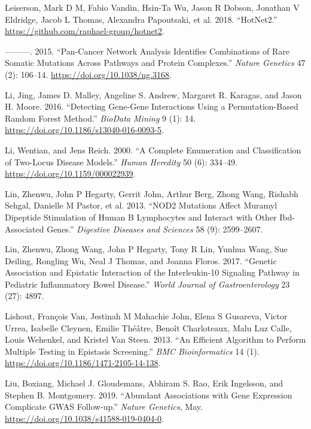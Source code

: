 \documentclass[
  11pt,
]{env/yjiao}
\newlength{\cslhangindent}
\newenvironment{cslreferences}%
  {\setlength{\parindent}{0pt}%
  \everypar{\setlength{\hangindent}{\cslhangindent}}\ignorespaces}%
  {\par}
\begin{document}
\begin{cslreferences}
\leavevmode\hypertarget{ref-hotnet2}{}%
Leiserson, Mark D M, Fabio Vandin, Hsin-Ta Wu, Jason R Dobson, Jonathan V Eldridge, Jacob L Thomas, Alexandra Papoutsaki, et al. 2018. ``HotNet2.'' \url{https://github.com/raphael-group/hotnet2}.

\leavevmode\hypertarget{ref-leiserson_pan-cancer_2015}{}%
---------. 2015. ``Pan-Cancer Network Analysis Identifies Combinations of Rare Somatic Mutations Across Pathways and Protein Complexes.'' \emph{Nature Genetics} 47 (2): 106--14. \url{https://doi.org/10.1038/ng.3168}.

\leavevmode\hypertarget{ref-li_detecting_2016}{}%
Li, Jing, James D. Malley, Angeline S. Andrew, Margaret R. Karagas, and Jason H. Moore. 2016. ``Detecting Gene-Gene Interactions Using a Permutation-Based Random Forest Method.'' \emph{BioData Mining} 9 (1): 14. \url{https://doi.org/10.1186/s13040-016-0093-5}.

\leavevmode\hypertarget{ref-li_complete_2000}{}%
Li, Wentian, and Jens Reich. 2000. ``A Complete Enumeration and Classification of Two-Locus Disease Models.'' \emph{Human Heredity} 50 (6): 334--49. \url{https://doi.org/10.1159/000022939}.

\leavevmode\hypertarget{ref-lin2013nod2}{}%
Lin, Zhenwu, John P Hegarty, Gerrit John, Arthur Berg, Zhong Wang, Rishabh Sehgal, Danielle M Pastor, et al. 2013. ``NOD2 Mutations Affect Muramyl Dipeptide Stimulation of Human B Lymphocytes and Interact with Other Ibd-Associated Genes.'' \emph{Digestive Diseases and Sciences} 58 (9): 2599--2607.

\leavevmode\hypertarget{ref-lin2017genetic}{}%
Lin, Zhenwu, Zhong Wang, John P Hegarty, Tony R Lin, Yunhua Wang, Sue Deiling, Rongling Wu, Neal J Thomas, and Joanna Floros. 2017. ``Genetic Association and Epistatic Interaction of the Interleukin-10 Signaling Pathway in Pediatric Inflammatory Bowel Disease.'' \emph{World Journal of Gastroenterology} 23 (27): 4897.

\leavevmode\hypertarget{ref-lishout_efficient_2013}{}%
Lishout, François Van, Jestinah M Mahachie John, Elena S Gusareva, Victor Urrea, Isabelle Cleynen, Emilie Théâtre, Benoît Charloteaux, Malu Luz Calle, Louis Wehenkel, and Kristel Van Steen. 2013. ``An Efficient Algorithm to Perform Multiple Testing in Epistasis Screening.'' \emph{BMC Bioinformatics} 14 (1). \url{https://doi.org/10.1186/1471-2105-14-138}.

\leavevmode\hypertarget{ref-liu_abundant_2019}{}%
Liu, Boxiang, Michael J. Gloudemans, Abhiram S. Rao, Erik Ingelsson, and Stephen B. Montgomery. 2019. ``Abundant Associations with Gene Expression Complicate GWAS Follow-up.'' \emph{Nature Genetics}, May. \url{https://doi.org/10.1038/s41588-019-0404-0}.


\end{cslreferences}
\end{document}
